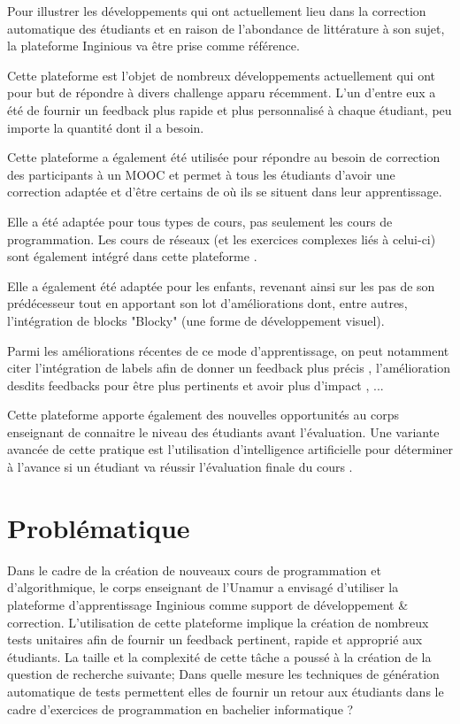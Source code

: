 \documentclass[a4paper]{report}
\begin{document}
Pour illustrer les développements qui ont actuellement lieu dans la correction automatique des étudiants et en raison de l'abondance de littérature à son sujet, la plateforme Inginious va être prise comme référence.

Cette plateforme est l'objet de nombreux développements actuellement qui ont pour but de répondre à divers challenge apparu récemment.
L'un d'entre eux a été de fournir un feedback plus rapide et plus personnalisé à chaque étudiant, peu importe la quantité dont il a besoin\cite{Staubitz2017}.

Cette plateforme a également été utilisée pour répondre au besoin de correction des participants à un MOOC et permet à tous les étudiants d'avoir une correction adaptée et d'être certains de où ils se situent dans leur apprentissage\cite{derval2015automatic}.

Elle a été adaptée pour tous types de cours, pas seulement les cours de programmation.
Les cours de réseaux (et les exercices complexes liés à celui-ci) sont également intégré dans cette plateforme \cite{Bonaventure2020}.

Elle a également été adaptée pour les enfants, revenant ainsi sur les pas de son prédécesseur tout en apportant son lot d'améliorations \cite{Thuin} dont, entre autres, l'intégration de blocks "Blocky" (une forme de développement visuel).

Parmi les améliorations récentes de ce mode d'apprentissage, on peut notamment citer l'intégration de labels afin de donner un feedback plus précis \cite{Martin}, l'amélioration desdits feedbacks pour être plus pertinents et avoir plus d'impact \cite{Derval2022}, ...

Cette plateforme apporte également des nouvelles opportunités au corps enseignant de connaitre le niveau des étudiants avant l'évaluation.
Une variante avancée de cette pratique est l'utilisation d'intelligence artificielle pour déterminer à l'avance si un étudiant va réussir l'évaluation finale du cours \cite{Hormaux}.


\chapter{Problématique}

Dans le cadre de la création de nouveaux cours de programmation et d'algorithmique, le corps enseignant de l’Unamur a envisagé d'utiliser la plateforme d'apprentissage Inginious comme support de développement \& correction.
L'utilisation de cette plateforme implique la création de nombreux tests unitaires afin de fournir un feedback pertinent, rapide et approprié aux étudiants.
La taille et la complexité de cette tâche a poussé à la création de la question de recherche suivante;
Dans quelle mesure les techniques de génération automatique de tests permettent elles de fournir un retour aux étudiants dans le cadre d'exercices de programmation en bachelier informatique ?
\end{document}
